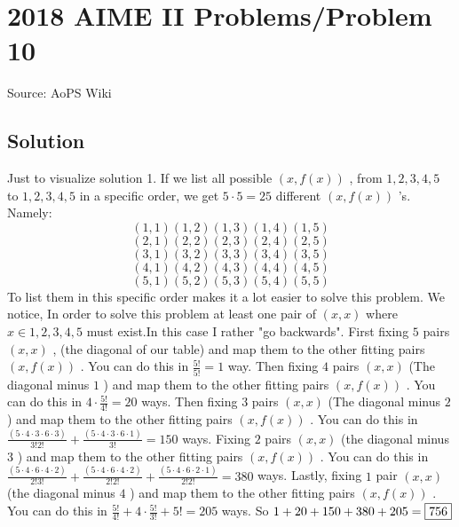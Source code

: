\documentclass[12pt]{article}
\begin{document}
\section*{{2018 AIME II Problems/Problem 10}}
Source: AoPS Wiki

\subsection*{Solution}
Just to visualize solution 1. If we list all possible $(x,f(x))$ , from ${1,2,3,4,5}$ to ${1,2,3,4,5}$ in a specific order, we get $5 \cdot 5 = 25$ different $(x,f(x))$ 's.
Namely: \[(1,1) (1,2) (1,3) (1,4) (1,5)\] \[(2,1) (2,2) (2,3) (2,4) (2,5)\] \[(3,1) (3,2) (3,3) (3,4) (3,5)\] \[(4,1) (4,2) (4,3) (4,4) (4,5)\] \[(5,1) (5,2) (5,3) (5,4) (5,5)\] To list them in this specific order makes it a lot easier to solve this problem. We notice, In order to solve this problem at least one pair of $(x,x)$ where $x\in{1,2,3,4,5}$ must exist.In this case I rather "go backwards". First fixing $5$ pairs $(x,x)$ , (the diagonal of our table) and map them to the other fitting pairs $(x,f(x))$ . You can do this in $\frac{5!}{5!} = 1$ way. Then fixing $4$ pairs $(x,x)$ (The diagonal minus $1$ ) and map them to the other fitting pairs $(x,f(x))$ . You can do this in $4\cdot\frac{5!}{4!} = 20$ ways. Then fixing $3$ pairs $(x,x)$ (The diagonal minus $2$ ) and map them to the other fitting pairs $(x,f(x))$ . You can do this in $\tfrac{(5\cdot4\cdot3\cdot6\cdot3)}{3!2!} + \tfrac{(5\cdot4\cdot3\cdot6\cdot1)}{3!} = 150$ ways.
Fixing $2$ pairs $(x,x)$ (the diagonal minus $3$ ) and map them to the other fitting pairs $(x,f(x))$ . You can do this in $\frac{(5\cdot4\cdot6\cdot4\cdot2)}{2!3!} + \frac{(5\cdot4\cdot6\cdot4\cdot2)}{2!2!} + \frac{(5\cdot4\cdot6\cdot2\cdot1)}{2!2!} = 380$ ways.
Lastly, fixing $1$ pair $(x,x)$ (the diagonal minus $4$ ) and map them to the other fitting pairs $(x,f(x))$ . You can do this in $\tfrac{5!}{4!} + 4\cdot\tfrac{5!}{3!} + 5! = 205$ ways. So $1 + 20 + 150 + 380 + 205 = \framebox{756}$
\end{document}

